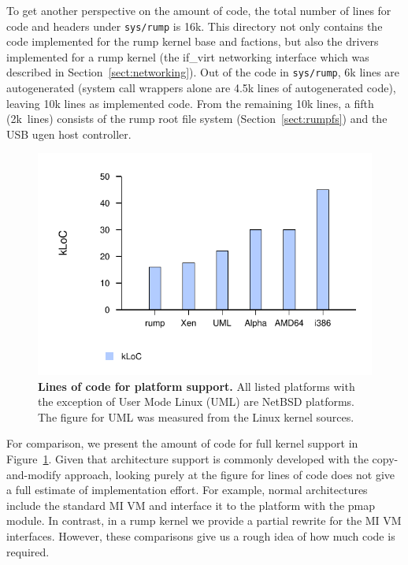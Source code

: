 To get another perspective on the amount of code, the total number
of lines for code and headers under \texttt{sys/rump} is 16k.
This directory not only contains the code implemented for the rump
kernel base and factions, but also the drivers implemented for a rump
kernel (\eg the if\_virt networking interface which was described in
Section~\ref{sect:networking}).  Out of the code in \texttt{sys/rump},
6k lines are autogenerated (system call wrappers alone are 4.5k lines of
autogenerated code), leaving 10k lines as implemented code.  From the
remaining 10k lines, a fifth (2k~lines) consists of the rump root file
system (Section~\ref{sect:rumpfs}) and the USB ugen host controller.

\begin{figure}[t]
\includegraphics{archlines}
\caption[Lines of code for platform support]{
\textbf{Lines of code for platform support.}
All listed platforms with the exception of User Mode Linux (UML)
are NetBSD platforms.  The figure for UML was measured from the Linux
kernel sources.
}
\label{fig:archloc}
\end{figure}

For comparison, we present the amount of code for full kernel support
in Figure~\ref{fig:archloc}.  Given that architecture support is
commonly developed with the copy-and-modify approach, looking purely
at the figure for lines of code does not give a full estimate of
implementation effort.  For example, normal architectures include
the standard MI VM and interface it to the platform with the pmap
module.  In contrast, in a rump kernel we provide a partial rewrite
for the MI VM interfaces.  However, these comparisons give us a
rough idea of how much code is required.

